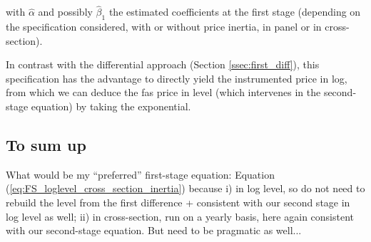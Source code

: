 \documentclass[11pt,twoside, authoryear]{elsarticle}
\begin{document}
\noindent with $ \widehat{ \alpha}$ and possibly $ \widehat{\beta}_1$ the estimated coefficients at the first stage (depending on the specification considered, with or without price inertia, in panel or in cross-section).

In contrast with the differential approach (Section \ref{ssec:first_diff}), this specification has the advantage to directly yield the instrumented price in log, from which we can deduce the fas price in level (which intervenes in the second-stage equation) by taking the exponential.

\subsection{To sum up}

What would be my ``preferred'' first-stage equation: Equation (\ref{eq:FS_loglevel_cross_section_inertia}) because i) in log level, so do not need to rebuild the level from the first difference + consistent with our second stage in log level as well; ii) in cross-section, run on a yearly basis, here again consistent with our second-stage equation. But need to be pragmatic as well...
\end{document}
